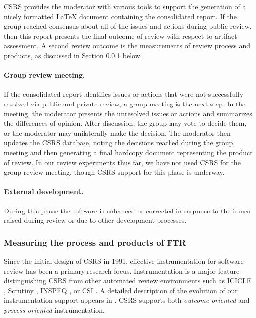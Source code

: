 CSRS provides the moderator with various tools to support the generation of
a nicely formatted LaTeX document containing
the consolidated report.  If the group reached consensus about all of the
issues and actions during public review, then this report presents the final
outcome of review with respect to artifact assessment.  A second review
outcome is the measurements of review process and products, as discussed
in Section \ref{sec:instrumentation} below.

\paragraph {Group review meeting.} If the consolidated report identifies issues or
actions that were not successfully resolved via public and private review,
a group meeting is the next step.  In the meeting, the moderator presents
the unresolved issues or actions and summarizes the differences of opinion.
After discussion, the group may vote to decide them, or the moderator may
unilaterally make the decision. The moderator then updates the CSRS
database, noting the decisions reached during the group meeting and then
generating a final hardcopy document representing the product of review.
In our review experiments thus far, we have not used CSRS for the group
review meeting, though CSRS support for this phase is underway.

\paragraph{External development.}  During this phase the software is
enhanced or corrected in response to the issues raised during review or due
to other development processes.

\subsubsection{Measuring the process and products of FTR}
\label{sec:instrumentation}

Since the initial design of CSRS in 1991, effective instrumentation for
software review has been a primary research focus.  Instrumentation is a
major feature distinguishing CSRS from other automated review environments
such as ICICLE \cite{Brothers90,Sembugamoorthy90}, Scrutiny
\cite{Gintell93}, INSPEQ \cite{Knight91}, or CSI \cite{Mashayekhi93}.  A
detailed description of the evolution of our instrumentation support
appears in \cite{csdl-93-07}.  CSRS supports both {\em outcome-oriented}
and {\em process-oriented} instrumentation.

